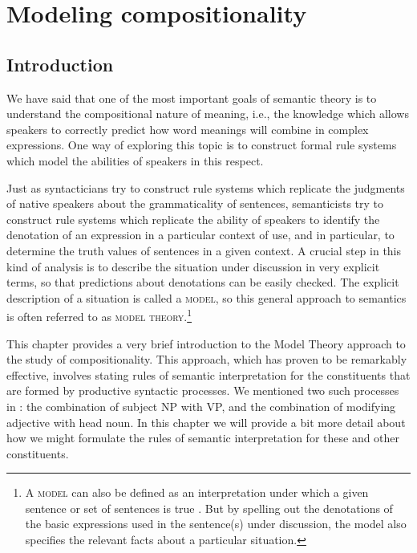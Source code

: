 \chapter{Modeling compositionality}\label{sec:13}

\section{Introduction}\label{sec:13.1}

We have said that one of the most important goals of semantic theory is to understand the compositional nature of meaning, i.e., the knowledge which allows speakers to correctly predict how word meanings will combine in complex expressions. One way of exploring this topic is to construct formal rule systems which model the abilities of speakers in this respect.



Just as syntacticians try to construct rule systems which replicate the judgments of native speakers about the grammaticality of sentences, semanticists try to construct rule systems which replicate the ability of speakers to identify the denotation of an expression in a particular context of use, and in particular, to determine the truth values of sentences in a given context. A crucial step in this kind of analysis is to describe the situation under discussion in very explicit terms, so that predictions about denotations can be easily checked. The explicit description of a situation is called a \textsc{model}, so this general approach to semantics is often referred to as \textsc{model theory}.\footnote{A \textsc{model} can also be defined as an interpretation under which a given sentence or set of sentences is true \citep{Hodges2013}. But by spelling out the denotations of the basic expressions used in the sentence(s) under discussion, the model also specifies the relevant facts about a particular situation.}



This chapter provides a very brief introduction to the Model Theory approach to the study of compositionality. This approach, which has proven to be remarkably effective, involves stating rules of semantic interpretation for the constituents that are formed by productive syntactic processes. We mentioned two such processes in : the combination of subject NP with VP, and the combination of modifying adjective with head noun. In this chapter we will provide a bit more detail about how we might formulate the rules of semantic interpretation for these and other constituents.



